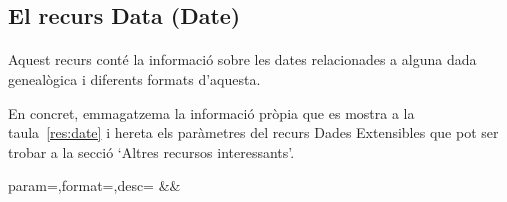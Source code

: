 \subsection{El recurs Data (Date)}

    \paragraph{}
    Aquest recurs conté la informació sobre les dates relacionades a alguna dada genealògica i diferents formats d'aquesta.

    En concret, emmagatzema la informació pròpia que es mostra a la taula~\ref{res:date} i hereta els paràmetres del recurs Dades Extensibles que pot ser trobar a la secció `Altres recursos interessants'.

    \begin{center}
             {param=\param,format=\format,desc=\desc}
             {\param&\format&\desc}
     \end{center}
